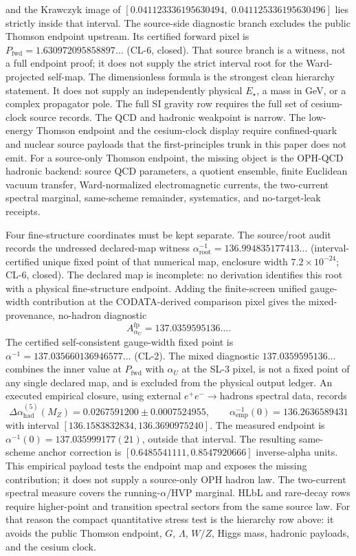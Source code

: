 \documentclass[11pt]{article}
\begin{document}
and the Krawczyk image of
\([0.041123336195630494,\;0.041125336195630496]\) lies strictly inside that interval. The
source-side diagnostic branch excludes the public Thomson endpoint upstream. Its certified
forward pixel is
\(P_{\mathrm{fwd}}=1.630972095858897\ldots\) (CL-6, closed).
That source branch is a witness, not a full endpoint proof; it does not supply the strict interval
root for the Ward-projected self-map. The dimensionless formula is the
strongest clean hierarchy statement. It does not supply an independently physical \(E_\star\), a mass
in GeV, or a complex propagator pole. The full SI gravity row requires the full set of
cesium-clock source records.
The QCD and hadronic weakpoint is narrow. The low-energy Thomson endpoint and the cesium-clock
display require confined-quark and nuclear source payloads that the first-principles trunk in this
paper does not emit. For a source-only Thomson endpoint, the missing object is the OPH-QCD
hadronic backend: source QCD parameters, a quotient ensemble, finite Euclidean vacuum transfer,
Ward-normalized electromagnetic currents, the two-current spectral marginal, same-scheme
remainder, systematics, and no-target-leak receipts.

Four fine-structure coordinates must be kept separate. The source/root audit records the
undressed declared-map witness
\(\alpha_{\mathrm{root}}^{-1}=136.994835177413\ldots\) (interval-certified unique fixed
point of that numerical map, enclosure width \(7.2\times10^{-24}\); CL-6, closed).
The declared map is incomplete: no derivation identifies this root with a physical
fine-structure endpoint. Adding the finite-screen unified
gauge-width contribution at the CODATA-derived comparison pixel gives the mixed-provenance,
no-hadron diagnostic
\[
A_{\alpha_U}^{\mathrm{fp}}=137.0359595136\ldots.
\]
The certified self-consistent gauge-width fixed point is
\(\alpha^{-1}=137.035660136946577\ldots\) (CL-2). The mixed diagnostic
\(137.0359595136\ldots\) combines the inner value at \(P_{\mathrm{fwd}}\) with
\(\alpha_U\) at the SL-3 pixel, is not a fixed point of any single declared map, and is
excluded from the physical output ledger.
An executed empirical closure, using external
\(e^+e^-\to\mathrm{hadrons}\) spectral data, records
\[
\Delta\alpha_{\mathrm{had}}^{(5)}(M_Z)
=0.0267591200\pm0.0007524955,
\qquad
\alpha_{\mathrm{emp}}^{-1}(0)=136.2636589431
\]
with interval \([136.1583832834,136.3690975240]\). The measured endpoint is
\(\alpha^{-1}(0)=137.035999177(21)\), outside that interval. The resulting same-scheme
anchor correction is \([0.6485541111,0.8547920666]\) inverse-alpha units. This empirical payload
tests the endpoint map and exposes the missing contribution; it does not supply a source-only OPH
hadron law. The two-current spectral measure covers the running-\(\alpha\)/HVP marginal. HLbL and
rare-decay rows require higher-point and transition spectral sectors from the same source law.
For that reason the compact quantitative stress test is the hierarchy row above: it avoids the
public Thomson endpoint, \(G\), \(\Lambda\), \(W/Z\), Higgs mass, hadronic payloads, and the
cesium clock.
\end{document}
